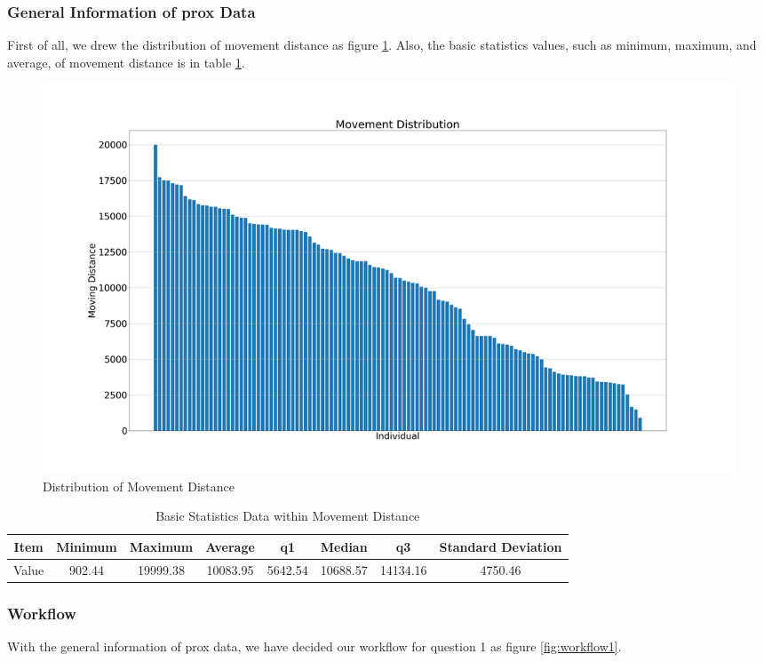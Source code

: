 \documentclass[aps, 10pt, a4paper]{article}
\begin{document}
            \subsubsection{General Information of prox Data}
                First of all, we drew the distribution of movement distance as figure \ref{fig:movementdist}. Also, the basic statistics values, such as minimum, maximum, and average, of movement distance is in table \ref{tb:movementdist}.
            
                \begin{figure}[htbp]
                    \centering
                    \includegraphics[width=0.6 \linewidth]{figures/movementdistribution.png}
                    \caption{Distribution of Movement Distance}
                    \label{fig:movementdist}
                \end{figure}
        
                \begin{table}[htbp]
                    \centering
                    \caption{Basic Statistics Data within Movement Distance}
                    \label{tb:movementdist}
                    \begin{tabular}{c||c|c|c|c|c|c|c}
                        Item & Minimum & Maximum & Average & q1 & Median & q3 & Standard Deviation \\ \hline
                        Value & 902.44 & 19999.38 & 10083.95 & 5642.54 & 10688.57 & 14134.16 & 4750.46 \\
                    \end{tabular}
                \end{table}
            
            \subsubsection{Workflow}
                With the general information of prox data, we have decided our workflow for question 1 as figure \ref{fig:workflow1}.
                
\end{document}
